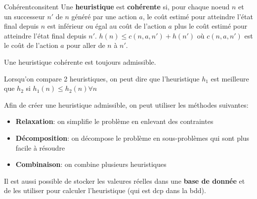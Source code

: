 \begin{definition}{Cohérent}{consitent}
    Une \textbf{heuristique} est \textbf{cohérente} si, pour chaque noeud $n$ et un successeur $n'$ de $n$ généré par une action $a$,
    le coût estimé pour atteindre l'état final depuis $n$ est inférieur ou égal au coût de l'action $a$ plus le coût estimé pour atteindre l'état final depuis $n'$. 
    \begin{math}
        h(n) \leq c(n, a, n') + h(n') 
    \end{math} 
    où $c(n, a, n')$ est le coût de l'action $a$ pour aller de $n$ à $n'$. 
\end{definition}

\begin{remark}\leavevmode
    Une heuristique cohérente est toujours admissible. 
\end{remark}

\begin{note}
    Lorsqu'on compare 2 heuristiques, on peut dire que l'heuristique $h_1$ est meilleure que $h_2$ si 
    \begin{math}
        h_1(n) \leq h_2(n) \forall n 
    \end{math}
\end{note}

Afin de créer une heuristique admissible, on peut utiliser les méthodes suivantes: 
\begin{itemize}
    \item \textbf{Relaxation}: on simplifie le problème en enlevant des contraintes
    \item \textbf{Décomposition}: on décompose le problème en sous-problèmes qui sont plus facile à résoudre
    \item \textbf{Combinaison}: on combine plusieurs heuristiques 
\end{itemize}

Il est aussi possible de stocker les valeures réelles dans une \textbf{base de donnée} 
et de les utiliser pour calculer l'heuristique (qui est dcp dans la bdd).

